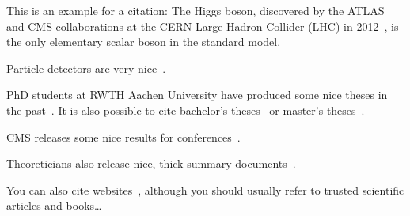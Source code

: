 \label{sec:theory}

This is an example for a citation:
The Higgs boson, discovered by the ATLAS and CMS collaborations at the CERN Large Hadron Collider (LHC) in 2012~\cite{ATLAS:2012yve,CMS:2012qbp}, is the only elementary scalar boson in the standard model.

Particle detectors are very nice~\cite{Kolanoski:2016gyf}.

PhD students at RWTH Aachen University have produced some nice theses in the past~\cite{Rieger:2019rgc}.
It is also possible to cite bachelor's theses~\cite{example_Bsc_thesis} or master's theses~\cite{example_Msc_thesis}.

CMS releases some nice results for conferences~\cite{CMS-PAS-SMP-22-009}.

Theoreticians also release nice, thick summary documents~\cite{LHCHiggsCrossSectionWorkingGroup:2016ypw}.

You can also cite websites~\cite{Guardian}, although you should usually refer to trusted scientific articles and books\dots
